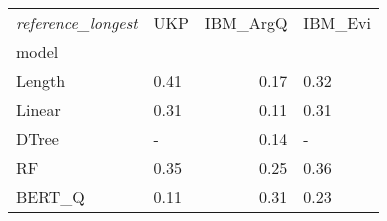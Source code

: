 \begin{tabular}{llrl}
\toprule
\textit{reference\_longest} &   UKP &  IBM\_ArgQ & IBM\_Evi \\
model  &       &           &         \\
\midrule
Length &  0.41 &      0.17 &    0.32 \\
Linear &  0.31 &      0.11 &    0.31 \\
DTree  &     - &      0.14 &       - \\
RF     &  0.35 &      0.25 &    0.36 \\
BERT\_Q &  0.11 &      0.31 &    0.23 \\
\bottomrule
\end{tabular}

